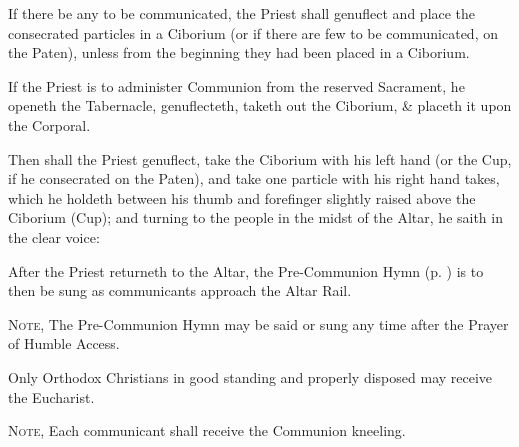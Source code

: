 \begin{rubric}
    If there be any to be communicated, the Priest shall genuflect and place the consecrated particles in a Ciborium (or if there are few to be communicated, on the Paten), unless from the beginning they had been placed in a Ciborium.
\end{rubric}
\begin{rubric}
    If the Priest is to administer Communion from the reserved Sacrament, he openeth the Tabernacle, genuflecteth, taketh out the Ciborium, \& placeth it upon the Corporal.
\end{rubric}
\begin{rubric}
    Then shall the Priest genuflect, take the Ciborium with his left hand (or the Cup, if he consecrated on the Paten), and take one particle with his right hand takes, which he holdeth between his thumb and forefinger slightly raised above the Ciborium (Cup); and turning to the people in the midst of the Altar, he saith in the clear voice:
\end{rubric}
\begin{rubric}
	After the Priest returneth to the Altar, the Pre-Communion Hymn (p. \pageref{byzantine}) is to then be sung as communicants approach the Altar Rail.\par
	\textsc{Note,} The Pre-Communion Hymn may be said or sung any time after the Prayer of Humble Access.
\end{rubric}
\begin{rubric}\label{communionrubrics}
    Only Orthodox Christians in good standing and properly disposed may receive the Eucharist.\par
    \textsc{Note,} Each communicant shall receive the Communion kneeling.
\end{rubric}
